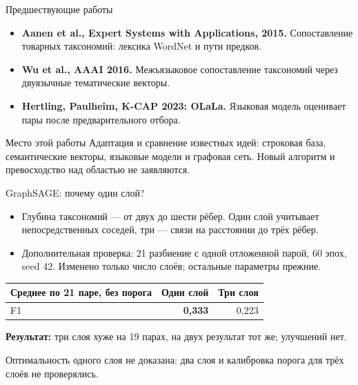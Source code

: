 \documentclass[aspectratio=169,11pt]{beamer}
\begin{document}
\renewcommand{\hseheadertext}{Дополнительные материалы}
\begin{frame}{Предшествующие работы}
  \begin{itemize}
    \item \textbf{Aanen et al., Expert Systems with Applications, 2015.}
      Сопоставление товарных таксономий: лексика WordNet и пути предков.
    \item \textbf{Wu et al., AAAI 2016.}
      Межъязыковое сопоставление таксономий через двуязычные тематические векторы.
    \item \textbf{Hertling, Paulheim, K-CAP 2023: OLaLa.}
      Языковая модель оценивает пары после предварительного отбора.
  \end{itemize}
  \begin{block}{Место этой работы}
    Адаптация и сравнение известных идей: строковая база, семантические векторы,
    языковые модели и графовая сеть. Новый алгоритм и превосходство над областью не заявляются.
  \end{block}
\end{frame}

\renewcommand{\hseheadertext}{Дополнительные материалы}
\begin{frame}{GraphSAGE: почему один слой?}
  \begin{itemize}
    \item Глубина таксономий — от двух до шести рёбер.
      Один слой учитывает непосредственных соседей, три — связи на расстоянии до трёх рёбер.
    \item Дополнительная проверка: 21 разбиение с одной отложенной парой,
      60 эпох, seed 42. Изменено только число слоёв; остальные параметры прежние.
  \end{itemize}
  \begin{center}
    \begin{tabular}{@{}lrr@{}}
      \toprule
      Среднее по 21 паре, без порога & Один слой & Три слоя \\
      \midrule
      F1 & \textbf{0{,}333} & 0{,}223 \\
      \bottomrule
    \end{tabular}
  \end{center}
  \textbf{Результат:} три слоя хуже на 19 парах, на двух результат тот же;
  улучшений нет.
  \par\smallskip
  Оптимальность одного слоя не доказана: два слоя и калибровка порога
  для трёх слоёв не проверялись.
\end{frame}
\end{document}
